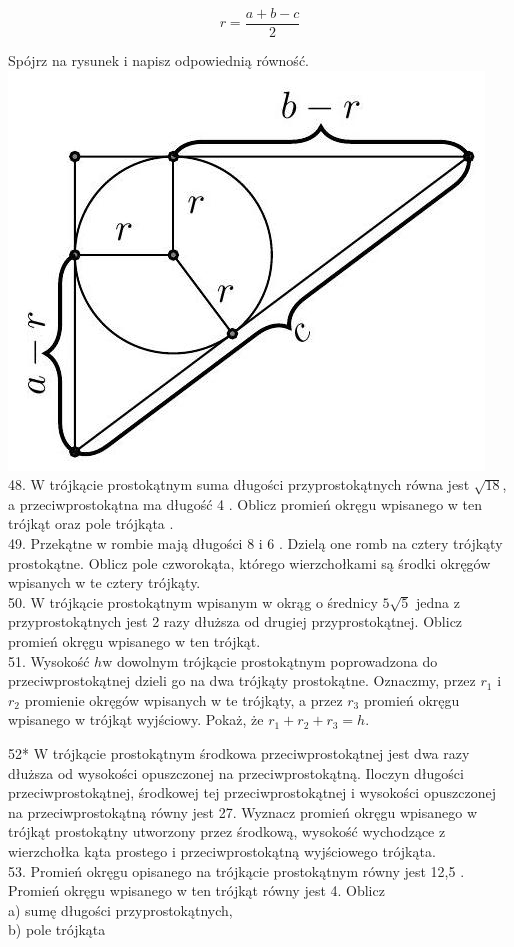 \documentclass[10pt]{article}
\begin{document}
\[
r=\frac{a+b-c}{2}
\]

Spójrz na rysunek i napisz odpowiednią równość.\\
\includegraphics[max width=\textwidth, center]{2024_11_21_e9b4faa005d5be2cc318g-041(1)}\\
48. W trójkącie prostokątnym suma długości przyprostokątnych równa jest \(\sqrt{18}\), a przeciwprostokątna ma długość 4 . Oblicz promień okręgu wpisanego w ten trójkąt oraz pole trójkąta .\\
49. Przekątne w rombie mają długości 8 i 6 . Dzielą one romb na cztery trójkąty prostokątne. Oblicz pole czworokąta, którego wierzchołkami są środki okręgów wpisanych w te cztery trójkąty.\\
50. W trójkącie prostokątnym wpisanym w okrąg o średnicy \(5 \sqrt{5}\) jedna z przyprostokątnych jest 2 razy dłuższa od drugiej przyprostokątnej. Oblicz promień okręgu wpisanego w ten trójkąt.\\
51. Wysokość \(h \mathrm{w}\) dowolnym trójkącie prostokątnym poprowadzona do przeciwprostokątnej dzieli go na dwa trójkąty prostokątne. Oznaczmy, przez \(r_{1}\) i \(r_{2}\) promienie okręgów wpisanych w te trójkąty, a przez \(r_{3}\) promień okręgu wpisanego w trójkąt wyjściowy. Pokaż, że \(r_{1}+r_{2}+r_{3}=h\).

52* W trójkącie prostokątnym środkowa przeciwprostokątnej jest dwa razy dłuższa od wysokości opuszczonej na przeciwprostokątną. Iloczyn długości przeciwprostokątnej, środkowej tej przeciwprostokątnej i wysokości opuszczonej na przeciwprostokątną równy jest 27. Wyznacz promień okręgu wpisanego w trójkąt prostokątny utworzony przez środkową, wysokość wychodzące z wierzchołka kąta prostego i przeciwprostokątną wyjściowego trójkąta.\\
53. Promień okręgu opisanego na trójkącie prostokątnym równy jest 12,5 . Promień okręgu wpisanego w ten trójkąt równy jest 4. Oblicz\\
a) sumę długości przyprostokątnych,\\
b) pole trójkąta
\end{document}

